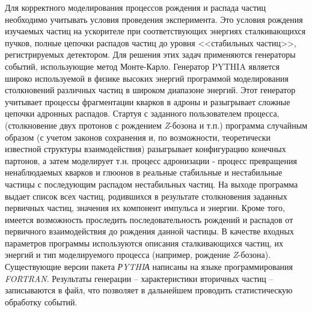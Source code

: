 Для корректного моделирования процессов рождения и распада частиц необходимо учитывать условия проведения эксперимента. Это условия рождения изучаемых частиц на ускорителе при соответствующих энергиях сталкивающихся пучков, полные цепочки распадов частиц до уровня <<стабильных частиц>>, регистрируемых детектором. Для решения этих задач применяются генераторы событий, использующие метод Монте-Карло.
Генератор PYTHIA является широко используемой в физике высоких энергий программой моделирования столкновений различных частиц в широком диапазоне энергий. Этот генератор учитывает процессы фрагментации кварков в адроны и разыгрывает сложные цепочки адронных распадов. Стартуя с заданного пользователем процесса, (столкновение двух протонов с рождением \textit{Z}-бозона и т.п.) программа случайным образом (с учетом законов сохранения и, по возможности, теоретически известной структуры взаимодействия) разыгрывает конфигурацию конечных партонов, а затем моделирует т.н. процесс адронизации - процесс превращения ненаблюдаемых кварков и глюонов в реальные стабильные и нестабильные частицы с последующим распадом нестабильных частиц. На выходе программа выдает список всех частиц, родившихся в результате столкновения заданных первичных частиц, значения их компонент импульса и энергии. Кроме того, имеется возможность проследить последовательность рождений и распадов от первичного взаимодействия до рождения данной частицы. В качестве входных параметров программы используются описания сталкивающихся частиц, их энергий и тип моделируемого процесса (например, рождение \textit{Z}-бозона). Существующие версии пакета \textit{РYTHIА} написаны на языке программирования \textit{FORTRAN}.
Результаты генерации -- характеристики вторичных частиц -- записываются в файл, что позволяет в дальнейшем проводить статистическую обработку событий.